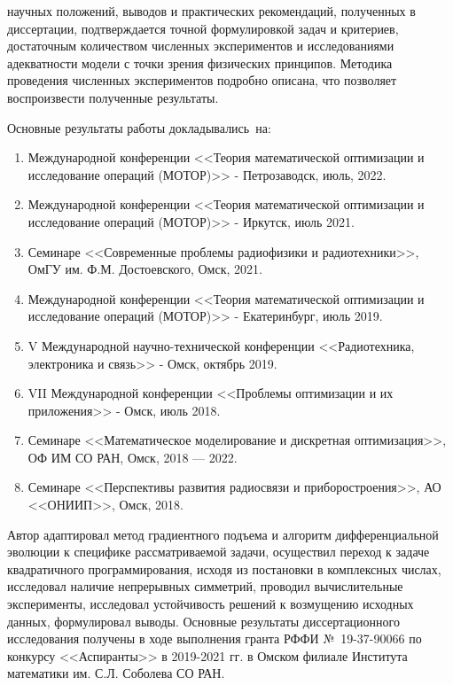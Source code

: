 {\reliability}  научных положений, выводов и практических рекомендаций,
полученных в диссертации, подтверждается  точной формулировкой задач и критериев, достаточным количеством
численных экспериментов и исследованиями адекватности модели с точки зрения физических принципов.
Методика проведения численных экспериментов подробно описана,
что позволяет воспроизвести полученные результаты.



{\probation}
Основные результаты работы докладывались~на:
\begin{enumerate}[beginpenalty=10000] %
  \item Международной конференции <<Теория математической оптимизации и исследование операций (МОТОР)>> - Петрозаводск, июль, 2022.
  \item Международной конференции <<Теория математической оптимизации и исследование операций (МОТОР)>> -  Иркутск, июль 2021.
  \item Семинаре <<Современные проблемы радиофизики и радиотехники>>, ОмГУ им. Ф.М. Достоевского, Омск, 2021.
  \item Международной конференции <<Теория математической оптимизации и исследование операций (МОТОР)>> - Екатеринбург, июль 2019.
  \item V Международной научно-технической конференции <<Радиотехника, электроника и связь>> - Омск, октябрь 2019.
  \item VII Международной конференции <<Проблемы оптимизации и их приложения>> - Омск, июль 2018.
  \item Семинаре <<Математическое моделирование и дискретная оптимизация>>, ОФ ИМ СО РАН, Омск, 2018 --- 2022.
  \item Семинаре <<Перспективы развития радиосвязи и приборостроения>>, АО <<ОНИИП>>, Омск, 2018.
\end{enumerate}

{\contribution} Автор адаптировал метод градиентного подъема и алгоритм дифференциальной эволюции к специфике рассматриваемой задачи, осуществил переход к задаче квадратичного программирования, исходя из постановки в комплексных числах, исследовал наличие непрерывных симметрий, проводил вычислительные эксперименты, исследовал устойчивость решений к возмущению исходных данных, формулировал выводы.
Основные результаты диссертационного исследования получены в ходе выполнения гранта РФФИ №~19-37-90066 по конкурсу <<Аспиранты>> в 2019-2021 гг. в Омском филиале Института математики им. С.Л. Соболева СО РАН.

